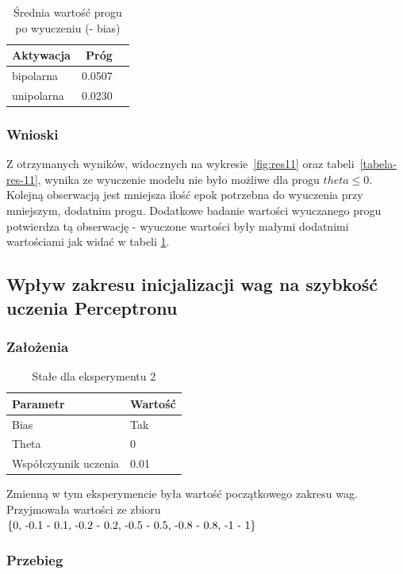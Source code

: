 \documentclass{article}
\begin{document}
\begin{table}[!h]
	\caption{Średnia wartość progu po wyuczeniu (- bias) }
	\label{tabela-res-12}
	\centering
	\begin{tabular}{lrr}
		\toprule
		Aktywacja  & Próg  \\
		\midrule
		bipolarna  & 0.0507 \\
		unipolarna & 0.0230 \\
		\bottomrule
	\end{tabular}
\end{table}

\subsubsection*{Wnioski}

Z otrzymanych wyników, widocznych na wykresie~\ref{fig:res11} oraz tabeli~\ref{tabela-res-11}, wynika ze wyuczenie modelu nie było możliwe dla progu \(theta \leq  0 \). Kolejną obserwacją jest mniejsza ilość epok potrzebna do wyuczenia przy mniejszym, dodatnim progu. Dodatkowe badanie wartości wyuczanego progu potwierdza tą obserwację - wyuczone wartości były małymi dodatnimi wartościami jak widać w tabeli \ref{tabela-res-12}.

\newpage
\subsection{Wpływ zakresu inicjalizacji wag na szybkość uczenia Perceptronu}
\subsubsection*{Założenia}
\begin{table}[!h]
	\caption{Stałe dla eksperymentu 2}
	\label{tabela-const-2}
	\centering
	\begin{tabular}{ll}
		\toprule
		Parametr               & Wartość \\
		\midrule
		Bias                   & Tak       \\
		Theta                  & 0         \\
		Współczynnik uczenia & 0.01      \\
		\bottomrule
	\end{tabular}
\end{table}

Zmienną w tym eksperymencie była wartość początkowego zakresu wag. Przyjmowała wartości ze zbioru \(\{$0, -0.1 - 0.1, -0.2 - 0.2, -0.5 - 0.5, -0.8 - 0.8, -1 - 1$\}\)
\subsubsection*{Przebieg}
\end{document}
